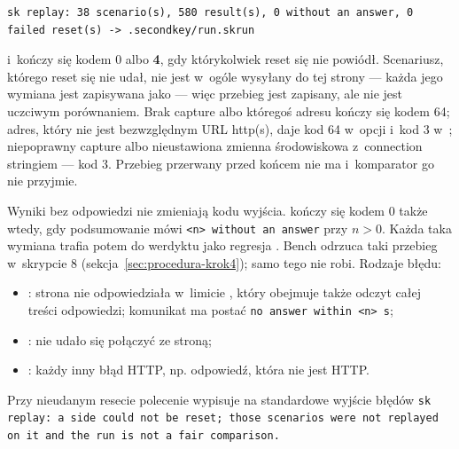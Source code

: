 \begin{lstlisting}
sk replay: 38 scenario(s), 580 result(s), 0 without an answer, 0 failed reset(s) -> .secondkey/run.skrun
\end{lstlisting}

i~kończy się kodem 0 albo \textbf{4}, gdy którykolwiek reset się nie powiódł. Scenariusz,
którego reset się nie udał, nie jest w~ogóle wysyłany do tej strony --- każda jego wymiana
jest zapisywana jako  --- więc przebieg jest zapisany, ale nie jest
uczciwym porównaniem. Brak capture albo któregoś adresu kończy się kodem 64; adres, który
nie jest bezwzględnym URL http(s), daje kod 64 w~opcji i~kod 3 w~;
niepoprawny capture albo nieustawiona zmienna środowiskowa z~connection stringiem --- kod 3. Przebieg
przerwany przed końcem nie ma  i~komparator go nie przyjmie.

Wyniki bez odpowiedzi nie zmieniają kodu wyjścia.  kończy się kodem 0
także wtedy, gdy podsumowanie mówi \texttt{<n> without an answer} przy $n > 0$. Każda taka
wymiana trafia potem do werdyktu jako regresja . Bench odrzuca
taki przebieg w~skrypcie 8 (sekcja~\ref{sec:procedura-krok4}); samo 
tego nie robi. Rodzaje błędu:
\begin{itemize}
  \item {}: strona nie odpowiedziała w~limicie , który
        obejmuje także odczyt całej treści odpowiedzi; komunikat ma postać
        \texttt{no answer within <n> s};
  \item {}: nie udało się połączyć ze stroną;
  \item {}: każdy inny błąd HTTP, np. odpowiedź, która nie jest HTTP.
\end{itemize}
Przy nieudanym resecie polecenie wypisuje na standardowe wyjście błędów \texttt{sk replay:
a side could not be reset; those scenarios were not replayed on it and the run is not a
fair comparison.}


